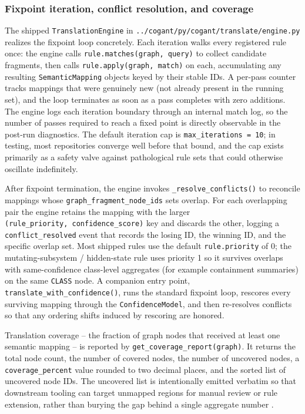 \documentclass[
]{article}
\begin{document}
\subsubsection{Fixpoint iteration, conflict resolution, and
coverage}\label{fixpoint-iteration-conflict-resolution-and-coverage}

The shipped \texttt{TranslationEngine} in
\texttt{../cogant/py/cogant/translate/engine.py} realizes the fixpoint
loop concretely. Each iteration walks every registered rule once: the
engine calls \texttt{rule.matches(graph,\ query)} to collect candidate
fragments, then calls \texttt{rule.apply(graph,\ match)} on each,
accumulating any resulting \texttt{SemanticMapping} objects keyed by
their stable IDs. A per-pass counter tracks mappings that were genuinely
new (not already present in the running set), and the loop terminates as
soon as a pass completes with zero additions. The engine logs each
iteration boundary through an internal match log, so the number of
passes required to reach a fixed point is directly observable in the
post-run diagnostics. The default iteration cap is
\texttt{max\_iterations\ =\ 10}; in testing, most repositories converge
well before that bound, and the cap exists primarily as a safety valve
against pathological rule sets that could otherwise oscillate
indefinitely.

After fixpoint termination, the engine invokes
\texttt{\_resolve\_conflicts()} to reconcile mappings whose
\texttt{graph\_fragment\_node\_ids} sets overlap. For each overlapping
pair the engine retains the mapping with the larger
\texttt{(rule\_priority,\ confidence\_score)} key and discards the
other, logging a \texttt{conflict\_resolved} event that records the
losing ID, the winning ID, and the specific overlap set. Most shipped
rules use the default \texttt{rule.priority} of 0; the
mutating-subsystem / hidden-state rule uses priority 1 so it survives
overlaps with same-confidence class-level aggregates (for example
containment summaries) on the same \texttt{CLASS} node. A companion
entry point, \texttt{translate\_with\_confidence()}, runs the standard
fixpoint loop, rescores every surviving mapping through the
\texttt{ConfidenceModel}, and then re-resolves conflicts so that any
ordering shifts induced by rescoring are honored.

Translation coverage -- the fraction of graph nodes that received at
least one semantic mapping -- is reported by
\texttt{get\_coverage\_report(graph)}. It returns the total node count,
the number of covered nodes, the number of uncovered nodes, a
\texttt{coverage\_percent} value rounded to two decimal places, and the
sorted list of uncovered node IDs. The uncovered list is intentionally
emitted verbatim so that downstream tooling can target unmapped regions
for manual review or rule extension, rather than burying the gap behind
a single aggregate number \citep{allamanis2018survey}.
\end{document}
